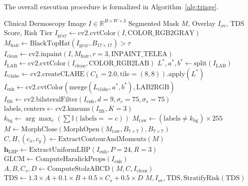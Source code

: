 \documentclass[conference]{IEEEtran}
\begin{document}
The overall execution procedure is formalized in Algorithm~\ref{alg:triage}.

\begin{algorithm}[htbp]
\caption{Automated Dermoscopy Lesion Triage \& Stolz TDS}
\label{alg:triage}
\begin{algorithmic}[1]
\REQUIRE Clinical Dermoscopy Image $I \in \mathbb{R}^{H \times W \times 3}$
\ENSURE Segmented Mask $M$, Overlay $I_{\text{ov}}$, TDS Score, Risk Tier
\STATE $I_{\text{gray}} \gets \text{cv2.cvtColor}(I, \text{COLOR\_RGB2GRAY})$
\STATE $M_{\text{hair}} \gets \text{BlackTopHat}(I_{\text{gray}}, B_{17 \times 17}) > \tau$
\STATE $I_{\text{clean}} \gets \text{cv2.inpaint}(I, M_{\text{hair}}, r=3, \text{INPAINT\_TELEA})$
\STATE $I_{\text{LAB}} \gets \text{cv2.cvtColor}(I_{\text{clean}}, \text{COLOR\_RGB2LAB})$
\STATE $L^*, a^*, b^* \gets \text{split}(I_{\text{LAB}})$
\STATE $L_{\text{clahe}} \gets \text{cv2.createCLAHE}(C_L=2.0, \text{tile}=(8,8)).\text{apply}(L^*)$
\STATE $I_{\text{enh}} \gets \text{cv2.cvtColor}(\text{merge}(L_{\text{clahe}}, a^*, b^*), \text{LAB2RGB})$
\STATE $I_{\text{filt}} \gets \text{cv2.bilateralFilter}(I_{\text{enh}}, d=9, \sigma_c=75, \sigma_s=75)$
\STATE $\text{labels}, \text{centers} \gets \text{cv2.kmeans}(I_{\text{filt}}, K=3)$
\STATE $k_{\text{bg}} \gets \arg\max_{c} (\sum \mathbb{I}(\text{labels} == c))$
\STATE $M_{\text{raw}} \gets (\text{labels} \neq k_{\text{bg}}) \times 255$
\STATE $M \gets \text{MorphClose}(\text{MorphOpen}(M_{\text{raw}}, B_{7 \times 7}), B_{7 \times 7})$
\STATE $C, H, (c_x, c_y) \gets \text{ExtractContourAndMoments}(M)$
\STATE $\mathbf{h}_{\text{LBP}} \gets \text{ExtractUniformLBP}(I_{\text{enh}}, P=24, R=3)$
\STATE $\text{GLCM} \gets \text{ComputeHaralickProps}(I_{\text{enh}})$
\STATE $A, B, C_s, D \gets \text{ComputeStolzABCD}(M, C, I_{\text{clean}})$
\STATE $\text{TDS} \gets 1.3 \times A + 0.1 \times B + 0.5 \times C_s + 0.5 \times D$
\RETURN $M, I_{\text{ov}}, \text{TDS}, \text{StratifyRisk}(\text{TDS})$
\end{algorithmic}
\end{algorithm}

\end{document}
